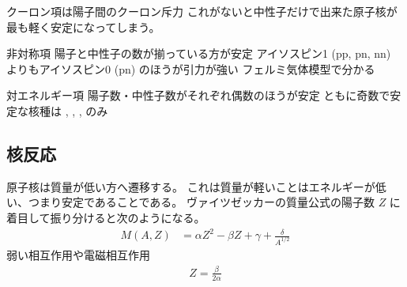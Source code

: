 \documentclass[uplatex,dvipdfmx,a4paper,11pt]{jlreq}
\numberwithin{equation}{section}
\theoremstyle{definition}
\begin{document}
クーロン項は陽子間のクーロン斥力
これがないと中性子だけで出来た原子核が最も軽く安定になってしまう。

非対称項
陽子と中性子の数が揃っている方が安定
アイソスピン1 (pp, pn, nn) よりもアイソスピン0 (pn) のほうが引力が強い
フェルミ気体模型で分かる

対エネルギー項
陽子数・中性子数がそれぞれ偶数のほうが安定
ともに奇数で安定な核種は , , ,  のみ


\subsection{核反応}
原子核は質量が低い方へ遷移する。
これは質量が軽いことはエネルギーが低い、つまり安定であることである。
ヴァイツゼッカーの質量公式の陽子数 $Z$ に着目して振り分けると次のようになる。
\begin{align}
  M(A, Z) & = \alpha Z^2 - \beta Z + \gamma + \frac{\delta}{A^{1/2}}
\end{align}
弱い相互作用や電磁相互作用
\begin{align}
  Z = \frac{\beta}{2\alpha}
\end{align}
\end{document}
